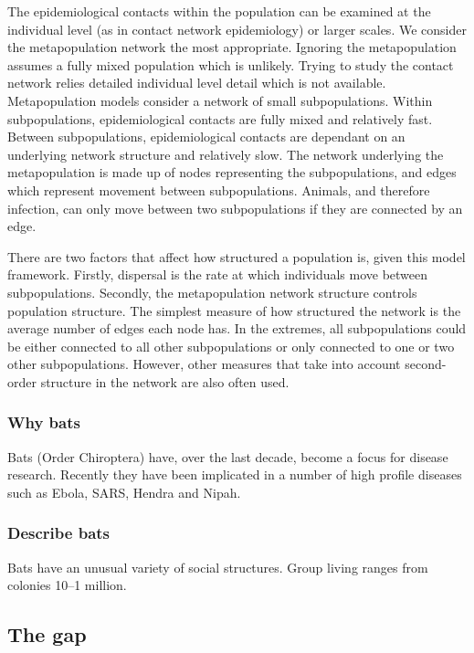 The epidemiological contacts within the population can be examined at the individual level (as in contact network epidemiology) or larger scales.
We consider the metapopulation network the most appropriate.
Ignoring the metapopulation assumes a fully mixed population which is unlikely.
Trying to study the contact network relies detailed individual level detail which is not available.
Metapopulation models consider a network of small subpopulations. 
Within subpopulations, epidemiological contacts are fully mixed and relatively fast.
Between subpopulations, epidemiological contacts are dependant on an underlying network structure and relatively slow.
The network underlying the metapopulation is made up of nodes representing the subpopulations, and edges which represent movement between subpopulations.
Animals, and therefore infection, can only move between two subpopulations if they are connected by an edge.

There are two factors that affect how structured a population is, given this model framework.
Firstly, dispersal is the rate at which individuals move between subpopulations.
Secondly, the metapopulation network structure controls population structure.
The simplest measure of how structured the network is the average number of edges each node has.
In the extremes, all subpopulations could be either connected to all other subpopulations or only connected to one or two other subpopulations.
However, other measures that take into account second-order structure in the network are also often used.




\subsubsection{Why bats}
Bats (Order Chiroptera) have, over the last decade, become a focus for disease research\cite{calisher2006bats, hughes2007emerging}.
Recently they have been implicated in a number of high profile diseases such as Ebola, SARS, Hendra and Nipah\cite{calisher2006bats, li2005bats}.


\subsubsection{Describe bats}

Bats have an unusual variety of social structures.
Group living ranges from colonies 10--1 million.



\subsection{The gap}

